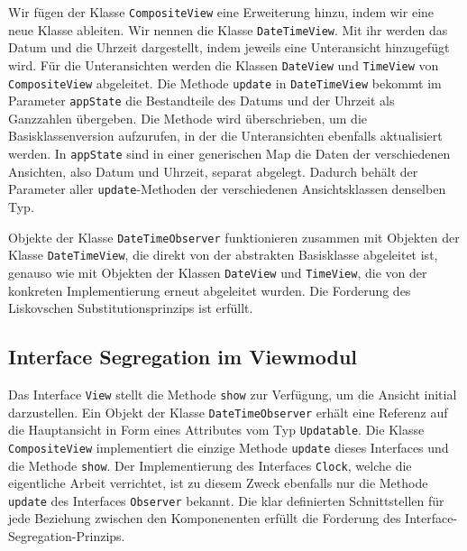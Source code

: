 \documentclass{vldb}
\begin{document}
Wir fügen der Klasse \texttt{CompositeView} eine Erweiterung hinzu, indem wir eine neue Klasse ableiten. Wir nennen die Klasse \texttt{DateTimeView}. Mit ihr werden das Datum und die Uhrzeit dargestellt, indem jeweils eine Unteransicht hinzu\-gefügt wird. Für die Unteransichten werden die Klassen \texttt{DateView} und \texttt{TimeView} von \texttt{CompositeView} abgeleitet. Die Methode \texttt{update} in \texttt{DateTimeView} be\-kommt im Parameter \texttt{appState} die Bestandteile des Datums und der Uhrzeit als Ganzzahlen übergeben. Die Methode wird über\-schrieben, um die Basisklassenversion aufzurufen, in der die Unteransichten ebenfalls aktualisiert werden. In \texttt{appState} sind in einer generischen Map die Daten der verschiedenen Ansichten, also Datum und Uhrzeit, separat abgelegt. Dadurch behält der Parameter aller \texttt{update}-Methoden der verschiedenen Ansichts\-klassen denselben Typ.

Objekte der Klasse \texttt{DateTimeObserver} funktionieren zu\-sammen mit Objekten der Klasse \texttt{DateTimeView}, die direkt von der abstrakten Basisklasse abgeleitet ist, genauso wie mit Objekten der Klassen \texttt{DateView} und \texttt{TimeView}, die von der konkreten Implementierung erneut abgeleitet wurden. Die Forderung des Liskovschen Substitutionsprinzips ist erfüllt.

\subsection{Interface Segregation im Viewmodul}
Das Interface \texttt{View} stellt die Methode \texttt{show} zur Verfügung, um die Ansicht initial darzustellen. Ein Objekt der Klasse \texttt{DateTimeObserver} erhält eine Referenz auf die Hauptansicht in Form eines Attributes vom Typ \texttt{Updatable}. Die Klasse \texttt{CompositeView} implementiert die einzige Methode \texttt{update} dieses Interfaces und die Methode \texttt{show}. Der Implementierung des Interfaces \texttt{Clock}, welche die eigentliche Arbeit verrichtet, ist zu diesem Zweck ebenfalls nur die Methode \texttt{update} des Interfaces \texttt{Observer} bekannt. Die klar definierten Schnittstellen für jede Beziehung zwischen den Komponenenten erfüllt die For\-de\-rung des In\-ter\-face-Seg\-re\-ga\-tion-Prinzips.
\end{document}

